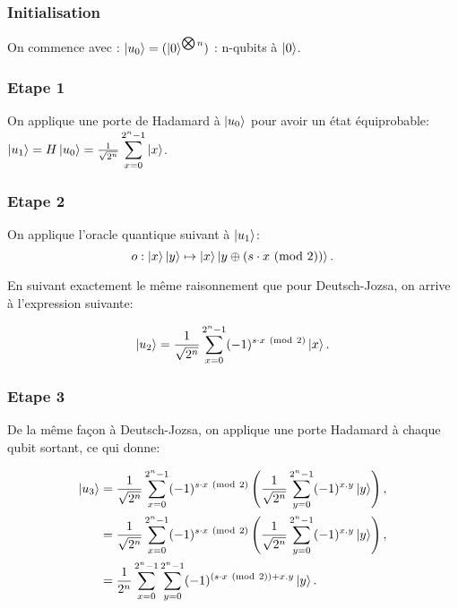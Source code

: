 \subsubsection{Initialisation}
On commence avec :
$\ket{u_0} = (\ket{0}^{\bigotimes n})$
: n-qubits à $\ket{0}$.

\subsubsection{Etape 1}

On applique une porte de Hadamard à $\ket{u_0}$ pour avoir un état équiprobable:
$\ket{u_1} = H\ket{u_0} = \frac{1}{\sqrt{2^n}}
\displaystyle\sum_{x=0}^{2^n-1} \ket{x}$.

\subsubsection{Etape 2}
On applique l'oracle quantique suivant à $\ket{u_1}$:
\[ o : \ket{x}\ket{y}\mapsto \ket{x}\ket{y\oplus (s \cdot x \ (\mathrm{mod}\ 2))}. 
\]

En suivant exactement le même raisonnement que pour Deutsch-Jozsa, on arrive à l'expression suivante: 

\begin{equation}\ket{u_2} = \frac{1}{\sqrt{2^n}}
\displaystyle\sum_{x=0}^{2^n-1} (-1)^{s \cdot x \ (\mathrm{mod}\ 2)}\ket{x}.
\end{equation}

\subsubsection{Etape 3}

De la même façon à Deutsch-Jozsa, on applique une porte Hadamard à chaque qubit sortant, ce qui donne:


\begin{align}
  \ket{u_3} & = \frac{1}{\sqrt{2^{n}}}
  \displaystyle\sum_{x=0}^{2^n-1} (-1)^{s \cdot x \ (\mathrm{mod}\ 2)} \left( \frac{1}{\sqrt{2^{n}}} \displaystyle\sum_{y=0}^{2^n-1} (-1)^{x.y}\ket{y} \right) \nonumber ,\\
  &= \frac{1}{\sqrt{2^{n}}}\displaystyle\sum_{x=0}^{2^n-1} (-1)^{s \cdot x \ (\mathrm{mod}\ 2)} \left( \frac{1}{\sqrt{2^{n}}} \displaystyle\sum_{y=0}^{2^n-1} (-1)^{x.y}\ket{y} \right) \nonumber ,\\
  & = \frac{1}{2^{n}} \displaystyle\sum_{x=0}^{2^n-1} \displaystyle\sum_{y=0}^{2^n-1} (-1)^{(s \cdot x \ (\mathrm{mod}\ 2)) + x.y} \ket{y} .
  \end{align}

